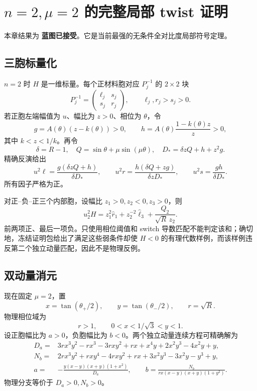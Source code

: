 \documentclass[UTF8,12pt,openany,fontset=fandol]{ctexrep}
\theoremstyle{definition}
\newcommand{\Trusted}{\textcolor{green!45!black}{\textbf{蓝图已接受}}}
\begin{document}
\chapter{$n=2,\mu=2$ 的完整局部 twist 证明}

本章结果为 \Trusted。它是当前最强的无条件全对比度局部符号定理。

\section{三胞标量化}

$n=2$ 时 $H$ 是一维标量。每个正材料胞对应 $P_j^{-1}$ 的 $2\times2$ 块
\begin{equation}
 P_j^{-1}=\begin{pmatrix}\ell_j&s_j\\s_j&r_j\end{pmatrix},\qquad
 \ell_j,r_j>s_j>0.
\end{equation}
若正胞左端幅值为 $u$、幅比为 $z>0$、相位为 $\theta$，令
\begin{equation}
 g=A(\theta)(z-k(\theta))>0,\qquad
 h=A(\theta)\frac{1-k(\theta)z}{z}>0,
\end{equation}
其中 $k<z<1/k$。再令
\begin{equation}
 \delta=R-1,\quad Q=\sin\theta+\mu\sin(\mu\theta),\quad
 D_*=\delta zQ+h+z^2g.
\end{equation}
精确反演给出
\begin{equation}\label{eq:blockfact}
 u^2\ell=\frac{g(\delta zQ+h)}{\delta D_*},\qquad
 u^2r=\frac{h(\delta Q+zg)}{\delta zD_*},\qquad
 u^2s=\frac{gh}{\delta D_*}.
\end{equation}
所有因子严格为正。

对正--负--正三个内部胞，设幅比 $z_1>0,z_2<0,z_3>0$，则
\begin{equation}\label{eq:Hscalar}
 u_2^2H=z_1^2\widehat r_1+z_2^{-2}\widehat\ell_3+\frac{Q_2}{\sqrt R\,z_2}.
\end{equation}
前两项正、最后一项负。只使用相位阈值和 switch 导数匹配不能判定该和；确切地，冻结证明包给出了满足这些弱条件却使 $H<0$ 的有理代数样例，而该样例违反第二个独立动量匹配，因此不是物理反例。

\section{双动量消元}

现在固定 $\mu=2$，置
\begin{equation}
 x=\tan(\theta_+/2),\qquad y=\tan(\theta_-/2),\qquad r=\sqrt R.
\end{equation}
物理相位域为
\begin{equation}\label{eq:mu2domain}
 r>1,\qquad 0<x<1/\sqrt3<y<1.
\end{equation}
设正胞幅比为 $a>0$，负胞幅比为 $b<0$。两个独立动量连续方程可精确解为
\begin{align}
 D_a={}&3rx^3y^2-rx^3-3rxy^2+rx+x^4y+2x^2y^3-4x^2y+y,\nonumber\\
 N_b={}&2rx^3y^2+rxy^4-4rxy^2+rx+3x^2y^3-3x^2y-y^3+y,\nonumber\\
 a={}&-\frac{y(x-y)(x+y)(1+x^2)}{D_a},\qquad
 b=\frac{N_b}{rx(x-y)(x+y)(1+y^2)}.\label{eq:abmu2}
\end{align}
物理分支等价于 $D_a>0,N_b>0$。
\end{document}
